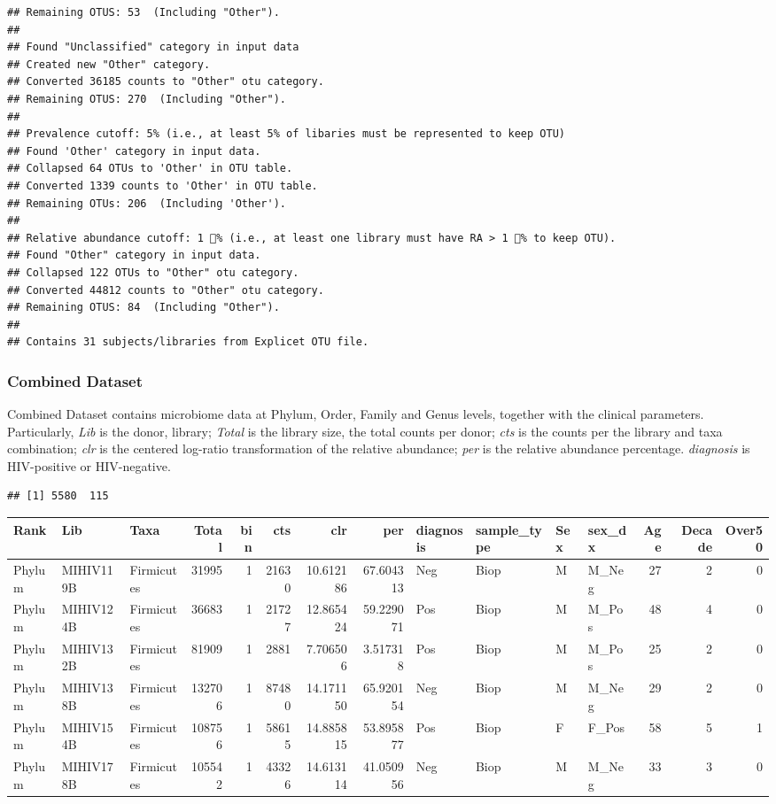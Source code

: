 \documentclass[]{article}
\begin{document}
\begin{verbatim}
## Remaining OTUS: 53  (Including "Other").
## 
## Found "Unclassified" category in input data
## Created new "Other" category.
## Converted 36185 counts to "Other" otu category.
## Remaining OTUS: 270  (Including "Other").
## 
## Prevalence cutoff: 5% (i.e., at least 5% of libaries must be represented to keep OTU)
## Found 'Other' category in input data.
## Collapsed 64 OTUs to 'Other' in OTU table.
## Converted 1339 counts to 'Other' in OTU table.
## Remaining OTUs: 206  (Including 'Other').
## 
## Relative abundance cutoff: 1 % (i.e., at least one library must have RA > 1 % to keep OTU).
## Found "Other" category in input data.
## Collapsed 122 OTUs to "Other" otu category.
## Converted 44812 counts to "Other" otu category.
## Remaining OTUS: 84  (Including "Other").
## 
## Contains 31 subjects/libraries from Explicet OTU file.
\end{verbatim}

\subsubsection{Combined Dataset}\label{combined-dataset}

Combined Dataset contains microbiome data at Phylum, Order, Family and
Genus levels, together with the clinical parameters.\\
Particularly, \emph{Lib} is the donor, library; \emph{Total} is the
library size, the total counts per donor; \emph{cts} is the counts per
the library and taxa combination; \emph{clr} is the centered log-ratio
transformation of the relative abundance; \emph{per} is the relative
abundance percentage. \emph{diagnosis} is HIV-positive or HIV-negative.

\begin{verbatim}
## [1] 5580  115
\end{verbatim}

\begin{longtable}[]{@{}lllrrrrrllllrrr@{}}
\toprule
Rank & Lib & Taxa & Total & bin & cts & clr & per & diagnosis &
sample\_type & Sex & sex\_dx & Age & Decade & Over50\tabularnewline
\midrule
\endhead
Phylum & MIHIV119B & Firmicutes & 31995 & 1 & 21630 & 10.612186 &
67.604313 & Neg & Biop & M & M\_Neg & 27 & 2 & 0\tabularnewline
Phylum & MIHIV124B & Firmicutes & 36683 & 1 & 21727 & 12.865424 &
59.229071 & Pos & Biop & M & M\_Pos & 48 & 4 & 0\tabularnewline
Phylum & MIHIV132B & Firmicutes & 81909 & 1 & 2881 & 7.706506 & 3.517318
& Pos & Biop & M & M\_Pos & 25 & 2 & 0\tabularnewline
Phylum & MIHIV138B & Firmicutes & 132706 & 1 & 87480 & 14.171150 &
65.920154 & Neg & Biop & M & M\_Neg & 29 & 2 & 0\tabularnewline
Phylum & MIHIV154B & Firmicutes & 108756 & 1 & 58615 & 14.885815 &
53.895877 & Pos & Biop & F & F\_Pos & 58 & 5 & 1\tabularnewline
Phylum & MIHIV178B & Firmicutes & 105542 & 1 & 43326 & 14.613114 &
41.050956 & Neg & Biop & M & M\_Neg & 33 & 3 & 0\tabularnewline
\bottomrule
\end{longtable}
\end{document}
